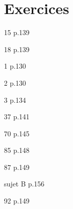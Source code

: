 \documentclass[10pt,a4paper,openany,twoside]{book}
\begin{document}
\section*{Exercices}
	\begin{bookexos}{15 p.139}\end{bookexos}


  \begin{bookexo}{18 p.139}\end{bookexo}
  \begin{bookact}{1 p.130}\end{bookact}
  \begin{bookact}{2 p.130}\end{bookact}

  \begin{bookact}{3 p.134}\end{bookact}
  \begin{bookexo}{37 p.141}\end{bookexo}

  \begin{bookexo}{70 p.145}\end{bookexo}

  \begin{bookexo}{85 p.148}\end{bookexo}
  \begin{bookexo}{87 p.149}\end{bookexo}
  \begin{bookexo}{sujet B p.156}\end{bookexo}
  \begin{bookexo}{92 p.149}\end{bookexo}
\end{document}

